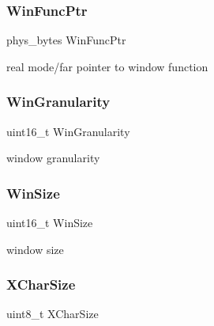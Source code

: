 \subsubsection{\texorpdfstring{Win\+Func\+Ptr}{WinFuncPtr}}
{\footnotesize\ttfamily phys\+\_\+bytes Win\+Func\+Ptr}



real mode/far pointer to window function 

\hypertarget{struct____attribute_____a38f205f799c6929629395f03e24de077}{}\label{struct____attribute_____a38f205f799c6929629395f03e24de077} 
\subsubsection{\texorpdfstring{Win\+Granularity}{WinGranularity}}
{\footnotesize\ttfamily uint16\+\_\+t Win\+Granularity}



window granularity 

\hypertarget{struct____attribute_____a78985f1c5ae166cb560099273cc558b4}{}\label{struct____attribute_____a78985f1c5ae166cb560099273cc558b4} 
\subsubsection{\texorpdfstring{Win\+Size}{WinSize}}
{\footnotesize\ttfamily uint16\+\_\+t Win\+Size}



window size 

\hypertarget{struct____attribute_____a047d8f41434f02589d0c9b90b17c67eb}{}\label{struct____attribute_____a047d8f41434f02589d0c9b90b17c67eb} 
\subsubsection{\texorpdfstring{X\+Char\+Size}{XCharSize}}
{\footnotesize\ttfamily uint8\+\_\+t X\+Char\+Size}



